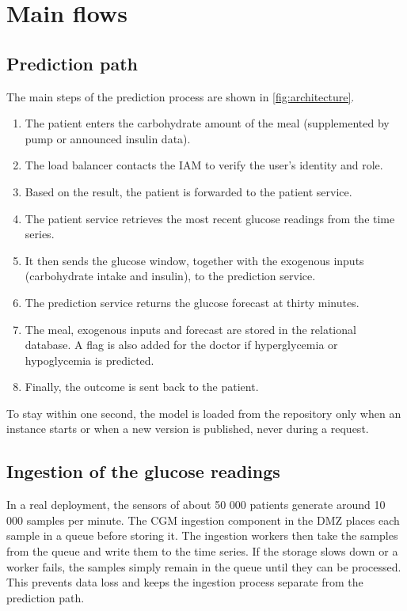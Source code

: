 \chapter{Main flows}
\label{ch:flows}

\section{Prediction path}
\label{sec:flow-prediction}

The main steps of the prediction process are shown in
\cref{fig:architecture}.

\begin{enumerate}
\item The patient enters the carbohydrate amount of the meal (supplemented by pump or announced insulin data).
\item The load balancer contacts the IAM to verify the user's identity
and role.
\item Based on the result, the patient is forwarded to the patient service.
\item The patient service retrieves the most recent glucose readings
from the time series.
\item It then sends the glucose window, together with the exogenous inputs
(carbohydrate intake and insulin), to the prediction service.
\item The prediction service returns the glucose forecast at thirty minutes.
\item The meal, exogenous inputs and forecast are stored in the relational
database. A flag is also added for the doctor if hyperglycemia or
hypoglycemia is predicted.
\item Finally, the outcome is sent back to the patient.
\end{enumerate}

To stay within one second, the model is loaded from the repository only when
an instance starts or when a new version is published, never during a request. 


\section{Ingestion of the glucose readings}
\label{sec:flow-ingestion}

In a real deployment, the sensors of about 50 000 patients generate around 10 000 samples per minute. The CGM ingestion component in the DMZ places each sample in a queue before storing it. The ingestion workers then take the samples from the queue and write them to the time series. If the storage slows down or a worker fails, the samples simply remain in the queue until they can be processed. This prevents data loss and keeps the ingestion process separate from the prediction path.

